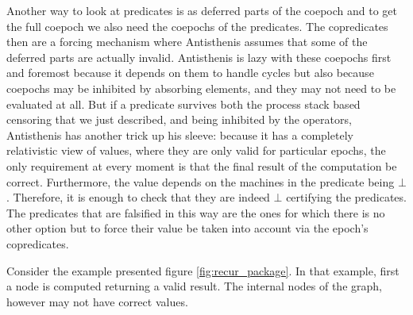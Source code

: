 Another way to look at predicates is as deferred parts of the coepoch and
to get the full coepoch we also need the coepochs of the
predicates. The copredicates then are a forcing mechanism where
Antisthenis assumes that some of the deferred parts are actually
invalid. Antisthenis is lazy with these coepochs first and foremost
because it depends on them to handle cycles but also because coepochs
may be inhibited by absorbing elements, and they may not need to
be evaluated at all. But if a predicate survives both the process
stack based censoring that we just described, and being inhibited by
the operators, Antisthenis has another trick up his sleeve: because it
has a completely relativistic view of values, where they are only
valid for particular epochs, the only requirement at every moment is
that the final result of the computation be correct. Furthermore, the
value depends on the machines in the predicate being
\(\bot\). Therefore, it is enough to check that they are indeed
\(\bot\) certifying the predicates. The predicates that are falsified
in this way are the ones for which there is no other option but to
force their value be taken into account via the epoch's copredicates.

Consider the example presented figure \ref{fig:recur_package}. In that
example, first a node is computed returning a valid result. The
internal nodes of the graph, however may not have correct
values.

